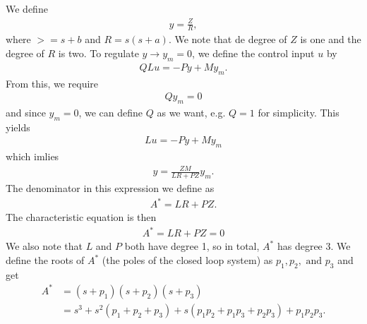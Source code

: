 \documentclass[]{article}
\begin{document}
\subsection{}
We define
\begin{equation}\begin{aligned}
y = \frac{Z}{R},
\end{aligned}\end{equation}
where $> = s+b$ and $R = s(s+a)$. We note that de degree of $Z$ is one and the degree of $R$ is two. To regulate $y \rightarrow y_m = 0$, we define the control input $u$ by
\begin{equation}\begin{aligned}
QLu = -Py + My_m.
\end{aligned}\end{equation}
From this, we require
\begin{equation}\begin{aligned}
Qy_m = 0
\end{aligned}\end{equation}
and since $y_m = 0$, we can define $Q$ as we want, e.g. $Q=1$ for simplicity. This yields
\begin{equation}\begin{aligned}
Lu = -Py + My_m
\end{aligned}\end{equation}
which imlies
\begin{equation}\begin{aligned}
y = \frac{ZM}{LR + PZ}y_m.
\end{aligned}\end{equation}
The denominator in this expression we define as
\begin{equation}\begin{aligned}
A^* = LR + PZ.
\end{aligned}\end{equation}
The characteristic equation is then
\begin{equation}\begin{aligned}
A^* = LR + PZ = 0
\end{aligned}\end{equation}
We also note that $L$ and $P$ both have degree 1, so in total, $A^*$ has degree 3. We define the roots of $A^*$ (the poles of the closed loop system) as $p_1, p_2, \text{ and } p_3$ and get
\begin{equation}\begin{aligned}
A^* &= (s + p_1)(s+p_2)(s+p_3)\\
&= s^3 + s^2(p_1 + p_2 + p_3) + s(p_1 p_2 + p_1p_3 + p_2p_3) + p_1p_2p_3.
\end{aligned}\end{equation}
\end{document}
